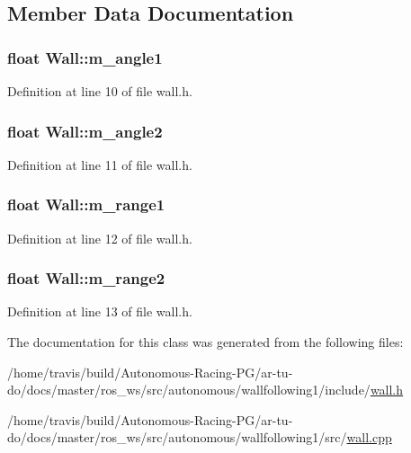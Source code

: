 \subsection{Member Data Documentation}
\subsubsection[{\texorpdfstring{m\+\_\+angle1}{m_angle1}}]{\setlength{\rightskip}{0pt plus 5cm}float Wall\+::m\+\_\+angle1}\hypertarget{class_wall_aa55464f62abb57889a95936563a20671}{}\label{class_wall_aa55464f62abb57889a95936563a20671}


Definition at line 10 of file wall.\+h.

\subsubsection[{\texorpdfstring{m\+\_\+angle2}{m_angle2}}]{\setlength{\rightskip}{0pt plus 5cm}float Wall\+::m\+\_\+angle2}\hypertarget{class_wall_a1acb9bc37500a68c08db14c3659c3cd0}{}\label{class_wall_a1acb9bc37500a68c08db14c3659c3cd0}


Definition at line 11 of file wall.\+h.

\subsubsection[{\texorpdfstring{m\+\_\+range1}{m_range1}}]{\setlength{\rightskip}{0pt plus 5cm}float Wall\+::m\+\_\+range1}\hypertarget{class_wall_a56b11c6748405e939de7cf4f9fabdc2d}{}\label{class_wall_a56b11c6748405e939de7cf4f9fabdc2d}


Definition at line 12 of file wall.\+h.

\subsubsection[{\texorpdfstring{m\+\_\+range2}{m_range2}}]{\setlength{\rightskip}{0pt plus 5cm}float Wall\+::m\+\_\+range2}\hypertarget{class_wall_aeb7c600e6e41792c60498ca310c833f1}{}\label{class_wall_aeb7c600e6e41792c60498ca310c833f1}


Definition at line 13 of file wall.\+h.



The documentation for this class was generated from the following files\+:\begin{DoxyCompactItemize}
\item 
/home/travis/build/\+Autonomous-\/\+Racing-\/\+P\+G/ar-\/tu-\/do/docs/master/ros\+\_\+ws/src/autonomous/wallfollowing1/include/\hyperlink{wall_8h}{wall.\+h}\item 
/home/travis/build/\+Autonomous-\/\+Racing-\/\+P\+G/ar-\/tu-\/do/docs/master/ros\+\_\+ws/src/autonomous/wallfollowing1/src/\hyperlink{wall_8cpp}{wall.\+cpp}\end{DoxyCompactItemize}
